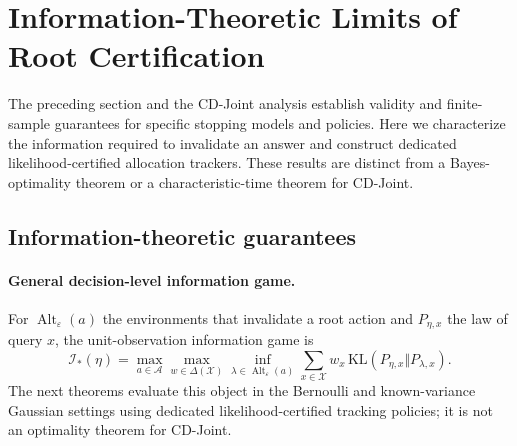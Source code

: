\documentclass{article}
\theoremstyle{plain}
\theoremstyle{definition}
\begin{document}
\clearpage

\section{Information-Theoretic Limits of Root Certification}
\label{app:group-info}

The preceding section and the CD-Joint analysis establish validity and finite-sample guarantees for specific stopping models and policies. Here we characterize the information required to invalidate an answer and construct dedicated likelihood-certified allocation trackers. These results are distinct from a Bayes-optimality theorem or a characteristic-time theorem for CD-Joint.

\subsection{Information-theoretic guarantees}\label{app:info-statements}
\paragraph{General decision-level information game.}
For $\operatorname{Alt}_\varepsilon(a)$ the environments that invalidate a root action and $P_{\eta,x}$ the law of query $x$, the unit-observation information game is
\begin{equation}
 \mathcal I_*(\eta)=\max_{a\in\mathcal A}\max_{w\in\Delta(\mathcal X)}
 \inf_{\lambda\in\operatorname{Alt}_\varepsilon(a)}\sum_{x\in\mathcal X}w_x\,\mathrm{KL}(P_{\eta,x}\Vert P_{\lambda,x}).
 \label{eq:main-info-game}
\end{equation}
The next theorems evaluate this object in the Bernoulli and known-variance Gaussian settings using dedicated likelihood-certified tracking policies; it is not an optimality theorem for CD-Joint.
\end{document}
